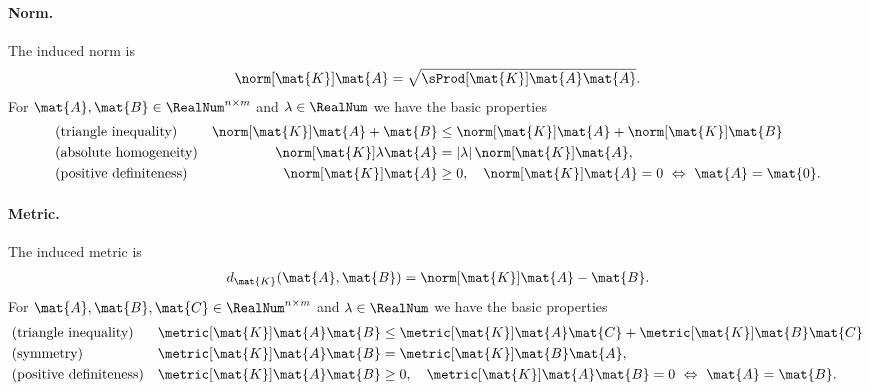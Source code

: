 \paragraph{Norm.}
The induced norm is
\begin{align}
 \norm[\mat{K}]{\mat{A}} = \sqrt{\sProd[\mat{K}]{\mat{A}}{\mat{A}}}.
\end{align}
For $\mat{A}, \mat{B} \in \RealNum^{n\times m}$ and $\lambda \in \RealNum$ we have the basic properties
\begin{subequations}
\begin{align}
 &\text{(triangle inequality)}&
 \norm[\mat{K}]{\mat{A}+\mat{B}} &\leq \norm[\mat{K}]{\mat{A}} + \norm[\mat{K}]{\mat{B}}
\\
 &\text{(absolute homogeneity)}&
 \norm[\mat{K}]{\lambda \mat{A}} &= |\lambda| \, \norm[\mat{K}]{\mat{A}},
\\
 &\text{(positive definiteness)}&
 \norm[\mat{K}]{\mat{A}} &\geq 0, \quad \norm[\mat{K}]{\mat{A}} = 0 \ \Leftrightarrow \ \mat{A} = \mat{0}.
\end{align}
\end{subequations}

\paragraph{Metric.}
The induced metric is
\begin{align}
 d_{\mat{K}}(\mat{A}, \mat{B}) = \norm[\mat{K}]{\mat{A}-\mat{B}}.
\end{align}
For $\mat{A}, \mat{B}, \mat{C} \in \RealNum^{n\times m}$ and $\lambda \in \RealNum$ we have the basic properties
\begin{subequations}
\begin{align}
 &\text{(triangle inequality)}&
 \metric[\mat{K}]{\mat{A}}{\mat{B}} &\leq \metric[\mat{K}]{\mat{A}}{\mat{C}} + \metric[\mat{K}]{\mat{B}}{\mat{C}}
\\
 &\text{(symmetry)}&
 \metric[\mat{K}]{\mat{A}}{\mat{B}} &= \metric[\mat{K}]{\mat{B}}{\mat{A}},
\\
 &\text{(positive definiteness)}&
 \metric[\mat{K}]{\mat{A}}{\mat{B}} &\geq 0, \quad \metric[\mat{K}]{\mat{A}}{\mat{B}} = 0 \ \Leftrightarrow \ \mat{A} = \mat{B}.
\end{align}
\end{subequations}


